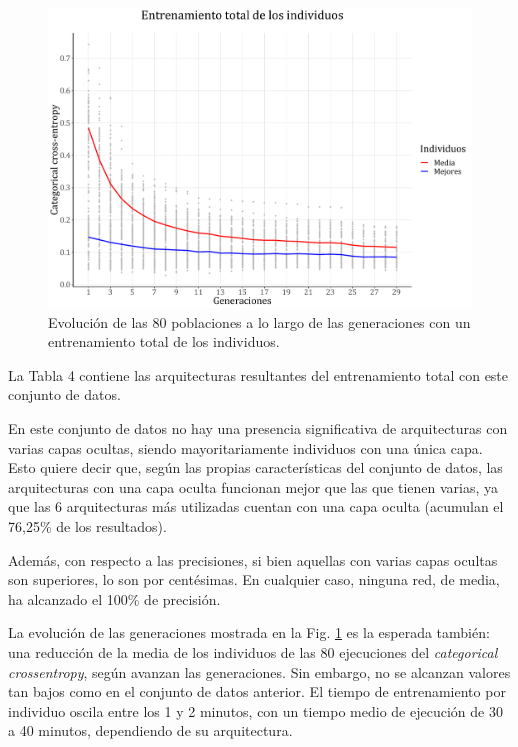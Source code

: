 \documentclass[spanish,a4paper,12pt,twoside]{report}
\begin{document}
  \begin{figure}[H]
    \centering
    \includegraphics[width = 1\textwidth]{resources/Fig20.pdf}
    \caption{Evolución de las 80 poblaciones a lo largo de las generaciones con un entrenamiento total de los individuos.}
    \label{fig:20}
  \end{figure} \par
  La Tabla 4 contiene las arquitecturas resultantes del entrenamiento total con este conjunto de datos. \par
  En este conjunto de datos no hay una presencia significativa de arquitecturas con varias capas ocultas, siendo mayoritariamente individuos con una única capa. Esto quiere decir que, según las propias características del conjunto de datos, las arquitecturas con una capa oculta funcionan mejor que las que tienen varias, ya que las 6 arquitecturas más utilizadas cuentan con una capa oculta (acumulan el 76,25\% de los resultados). \par
  Además, con respecto a las precisiones, si bien aquellas con varias capas ocultas son superiores, lo son por centésimas. En cualquier caso, ninguna red, de media, ha alcanzado el 100\% de precisión. \par
  La evolución de las generaciones mostrada en la Fig. \ref{fig:20} es la esperada también: una reducción de la media de los individuos de las 80 ejecuciones del \emph{categorical crossentropy}, según avanzan las generaciones. Sin embargo, no se alcanzan valores tan bajos como en el conjunto de datos anterior.
  El tiempo de entrenamiento por individuo oscila entre los 1 y 2 minutos, con un tiempo medio de ejecución de 30 a 40 minutos, dependiendo de su arquitectura. \par
\end{document}

